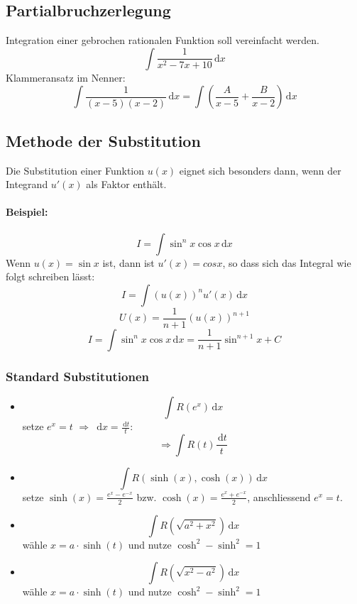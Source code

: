 \documentclass[12pt]{article}
\newcommand{\ud}{\,\mathrm{d}}
\begin{document}
\begin{multicols*}{3}
			\subsection{Partialbruchzerlegung} %
				Integration einer gebrochen rationalen Funktion soll vereinfacht werden.
				\[
					\int \frac{1}{x^2 -7x+10} \ud x
				\]
				Klammeransatz im Nenner:
				\[
				\int \frac{1}{(x-5)(x-2)} \ud x = \int \left(\frac{A}{x-5} + \frac{B}{x-2}\right) \ud x
				\]
			\subsection{Methode der Substitution} %
				Die Substitution einer Funktion $u(x)$ eignet sich besonders dann, wenn der Integrand $u'(x)$ als Faktor enthält.
				
				\paragraph{Beispiel:}
					\[
						I = \int \sin^n x \cos x \ud x
					\]
					Wenn $u(x) = \sin x$ ist, dann ist $u'(x) = cos x$, so dass sich das Integral wie folgt schreiben lässt:
					\[
						I = \int (u(x))^n u'(x) \ud x
					\]
					\[
						U(x) = \frac{1}{n+1} (u(x))^{n+1}
					\]
					\[
						I = \int \sin^n x \cos x \ud x = \frac{1}{n+1} \sin^{n+1} x + C
					\]
					
				\subsubsection{Standard Substitutionen} %
					\begin{itemize}
						\item \[
							\int R(e^x) \ud x
						\]
						setze $e^x = t$ $\Rightarrow$ $\ud x = \frac{\ud t}{t}$:
						\[
							\Rightarrow \int R(t) \frac{\ud t}{t}
						\]
					
						\item \[
							\int R(\sinh (x), \cosh (x)) \ud x
						\]
						setze $\sinh(x) = \frac{e^x - e^{-x}}{2}$ bzw. $\cosh(x) = \frac{e^x + e^{-x}}{2}$, anschliessend $e^x = t$.
					
						\item \[
							\int R(\sqrt{a^2 + x^2}) \ud x
						\]
						wähle $x = a \cdot \sinh(t)$ und nutze $\cosh^2 - \sinh^2 = 1$
					
						\item \[
							\int R(\sqrt{x^2 - a^2}) \ud x
						\]
						wähle $x = a \cdot \sinh(t)$ und nutze $\cosh^2 - \sinh^2 = 1$
					

\end{itemize}
\end{multicols*}
\end{document}
